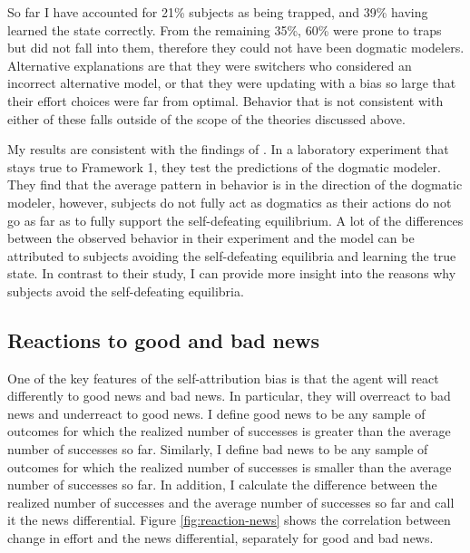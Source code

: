 \documentclass[
  12pt,
]{article}
\begin{document}
So far I have accounted for 21\% subjects as being trapped, and 39\%
having learned the state correctly. From the remaining 35\%, 60\% were
prone to traps but did not fall into them, therefore they could not have
been dogmatic modelers. Alternative explanations are that they were
switchers who considered an incorrect alternative model, or that they
were updating with a bias so large that their effort choices were far
from optimal. Behavior that is not consistent with either of these falls
outside of the scope of the theories discussed above.

My results are consistent with the findings of \citet{Hestermann2021}.
In a laboratory experiment that stays true to Framework 1, they test the
predictions of the dogmatic modeler. They find that the average pattern
in behavior is in the direction of the dogmatic modeler, however,
subjects do not fully act as dogmatics as their actions do not go as far
as to fully support the self-defeating equilibrium. A lot of the
differences between the observed behavior in their experiment and the
model can be attributed to subjects avoiding the self-defeating
equilibria and learning the true state. In contrast to their study, I
can provide more insight into the reasons why subjects avoid the
self-defeating equilibria.

\hypertarget{reactions-to-good-and-bad-news}{%
\subsection{Reactions to good and bad
news}\label{reactions-to-good-and-bad-news}}

One of the key features of the self-attribution bias is that the agent
will react differently to good news and bad news. In particular, they
will overreact to bad news and underreact to good news. I define good
news to be any sample of outcomes for which the realized number of
successes is greater than the average number of successes so far.
Similarly, I define bad news to be any sample of outcomes for which the
realized number of successes is smaller than the average number of
successes so far. In addition, I calculate the difference between the
realized number of successes and the average number of successes so far
and call it the news differential. Figure \ref{fig:reaction-news} shows
the correlation between change in effort and the news differential,
separately for good and bad news.
\end{document}
